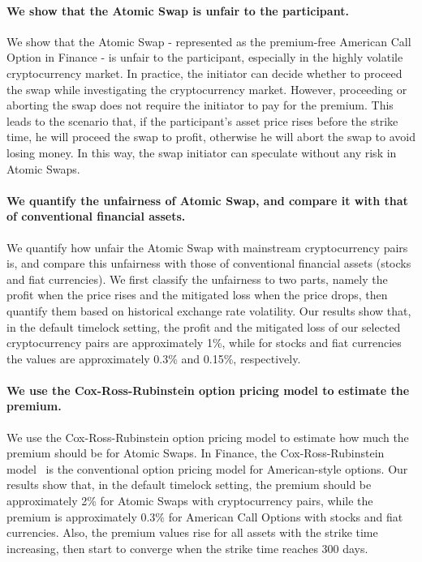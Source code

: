 \paragraph{We show that the Atomic Swap is unfair to the participant.}
We show that the Atomic Swap - represented as the premium-free American Call Option in Finance - is unfair to the participant, especially in the highly volatile cryptocurrency market.
In practice, the initiator can decide whether to proceed the swap while investigating the cryptocurrency market.
However, proceeding or aborting the swap does not require the initiator to pay for the premium.
This leads to the scenario that, if the participant's asset price rises before the strike time, he will proceed the swap to profit, otherwise he will abort the swap to avoid losing money.
In this way, the swap initiator can speculate without any risk in Atomic Swaps.

\paragraph{We quantify the unfairness of Atomic Swap, and compare it with that of conventional financial assets.}
We quantify how unfair the Atomic Swap with mainstream cryptocurrency pairs is, and compare this unfairness with those of conventional financial assets (stocks and fiat currencies).
We first classify the unfairness to two parts, namely the profit when the price rises and the mitigated loss when the price drops, then quantify them based on historical exchange rate volatility.
Our results show that, in the default timelock setting, the profit and the mitigated loss of our selected cryptocurrency pairs are approximately 1\%, while for stocks and fiat currencies the values are approximately 0.3\% and 0.15\%, respectively.

\paragraph{We use the Cox-Ross-Rubinstein option pricing model to estimate the premium.}
We use the Cox-Ross-Rubinstein option pricing model to estimate how much the premium should be for Atomic Swaps.
In Finance, the Cox-Ross-Rubinstein model~\cite{cox1979option} is the conventional option pricing model for American-style options.
Our results show that, in the default timelock setting, the premium should be approximately 2\% for Atomic Swaps with cryptocurrency pairs, while the premium is approximately $0.3\%$ for American Call Options with stocks and fiat currencies.
Also, the premium values rise for all assets with the strike time increasing, then start to converge when the strike time reaches 300 days.

